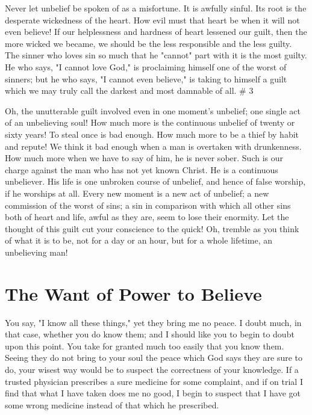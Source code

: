 \documentclass[
]{book}
\begin{document}
Never let unbelief be spoken of as a misfortune. It is awfully sinful. Its root is the desperate wickedness of the heart. How evil must that heart be when it will not even believe! If our helplessness and hardness of heart lessened our guilt, then the more wicked we became, we should be the less responsible and the less guilty. The sinner who loves sin so much that he "cannot" part with it is the most guilty. He who says, "I cannot love God," is proclaiming himself one of the worst of sinners; but he who says, "I cannot even believe," is taking to himself a guilt which we may truly call the darkest and most damnable of all.
\# 3

Oh, the unutterable guilt involved even in one moment's unbelief; one single act of an unbelieving soul! How much more is the continuous unbelief of twenty or sixty years! To steal once is bad enough. How much more to be a thief by habit and repute! We think it bad enough when a man is overtaken with drunkenness. How much more when we have to say of him, he is never sober. Such is our charge against the man who has not yet known Christ. He is a continuous unbeliever. His life is one unbroken course of unbelief, and hence of false worship, if he worships at all. Every new moment is a new act of unbelief; a new commission of the worst of sins; a sin in comparison with which all other sins both of heart and life, awful as they are, seem to lose their enormity. Let the thought of this guilt cut your conscience to the quick! Oh, tremble as you think of what it is to be, not for a day or an hour, but for a whole lifetime, an unbelieving man!

\hypertarget{the-want-of-power-to-believe}{%
\chapter{The Want of Power to Believe}\label{the-want-of-power-to-believe}}

You say, "I know all these things," yet they bring me no peace. I doubt much, in that case, whether you do know them; and I should like you to begin to doubt upon this point. You take for granted much too easily that you know them. Seeing they do not bring to your soul the peace which God says they are sure to do, your wisest way would be to suspect the correctness of your knowledge. If a trusted physician prescribes a sure medicine for some complaint, and if on trial I find that what I have taken does me no good, I begin to suspect that I have got some wrong medicine instead of that which he prescribed.
\end{document}
